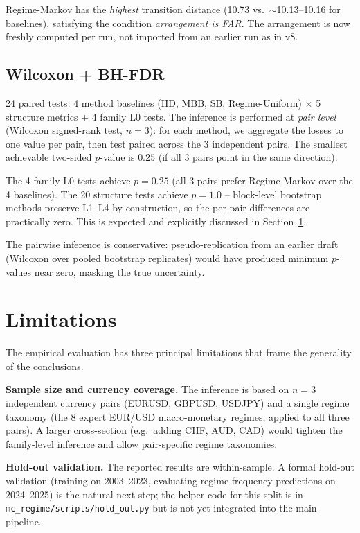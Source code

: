 \documentclass[11pt,a4paper]{article}
\theoremstyle{definition}
\begin{document}
Regime-Markov has the \emph{highest} transition distance (10.73 vs.\ $\sim$10.13--10.16 for baselines), satisfying the condition \emph{arrangement is FAR}. The arrangement is now freshly computed per run, not imported from an earlier run as in v8.

\subsection{Wilcoxon + BH-FDR}

24 paired tests: 4 method baselines (IID, MBB, SB, Regime-Uniform) $\times$ 5 structure metrics + 4 family L0 tests. The inference is performed at \emph{pair level} (Wilcoxon signed-rank test, $n=3$): for each method, we aggregate the losses to one value per pair, then test paired across the 3 independent pairs. The smallest achievable two-sided $p$-value is $0.25$ (if all 3 pairs point in the same direction).

The 4 family L0 tests achieve $p=0.25$ (all 3 pairs prefer Regime-Markov over the 4 baselines). The 20 structure tests achieve $p=1.0$ -- block-level bootstrap methods preserve L1--L4 by construction, so the per-pair differences are practically zero. This is expected and explicitly discussed in Section~\ref{sec:limits}.

The pairwise inference is conservative: pseudo-replication from an earlier draft (Wilcoxon over pooled bootstrap replicates) would have produced minimum $p$-values near zero, masking the true uncertainty.

\section{Limitations}
\label{sec:limits}

The empirical evaluation has three principal limitations that
frame the generality of the conclusions.

\textbf{Sample size and currency coverage.} The inference is based
on $n = 3$ independent currency pairs (EURUSD, GBPUSD, USDJPY) and
a single regime taxonomy (the 8 expert EUR/USD macro-monetary
regimes, applied to all three pairs). A larger cross-section
(e.g.\ adding CHF, AUD, CAD) would tighten the family-level
inference and allow pair-specific regime taxonomies.

\textbf{Hold-out validation.} The reported results are within-sample.
A formal hold-out validation (training on 2003--2023, evaluating
regime-frequency predictions on 2024--2025) is the natural next
step; the helper code for this split is in
\texttt{mc\_regime/scripts/hold\_out.py} but is not yet integrated
into the main pipeline.
\end{document}
